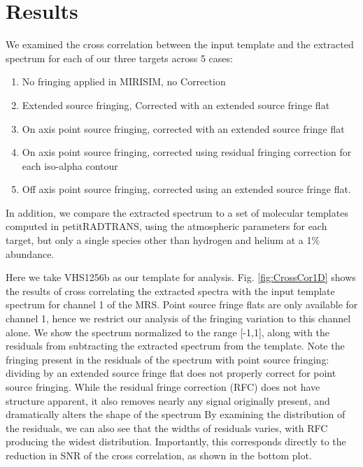 \section{Results}
We examined the cross correlation between the input template and the extracted spectrum for each of our three targets across 5 cases:
\begin{enumerate}
	\item No fringing applied in MIRISIM, no Correction
	\item Extended source fringing, Corrected with an extended source fringe flat
	\item On axis point source fringing, corrected with an extended source fringe flat
	\item On axis point source fringing, corrected using residual fringing correction for each iso-alpha contour
	\item Off axis point source fringing, corrected using an extended source fringe flat.
\end{enumerate}
In addition, we compare the extracted spectrum to a set of molecular templates computed in petitRADTRANS, using the atmospheric parameters for each target, but only a single species other than hydrogen and helium at a 1\% abundance.

Here we take VHS1256b as our template for analysis.
Fig. \ref{fig:CrossCor1D} shows the results of cross correlating the extracted spectra with the input template spectrum for channel 1 of the MRS.
Point source fringe flats are only available for channel 1, hence we restrict our analysis of the fringing variation to this channel alone.
We show the spectrum normalized to the range [-1,1], along with the residuals from subtracting the extracted spectrum from the template.
Note the fringing present in the residuals of the spectrum with point source fringing: dividing by an extended source fringe flat does not properly correct for point source fringing.
While the residual fringe correction (RFC) does not have structure apparent, it also removes nearly any signal originally present, and dramatically alters the shape of the spectrum
By examining the distribution of the residuals, we can also see that the widths of residuals varies, with RFC producing the widest distribution.
Importantly, this corresponds directly to the reduction in SNR of the cross correlation, as shown in the bottom plot. 

